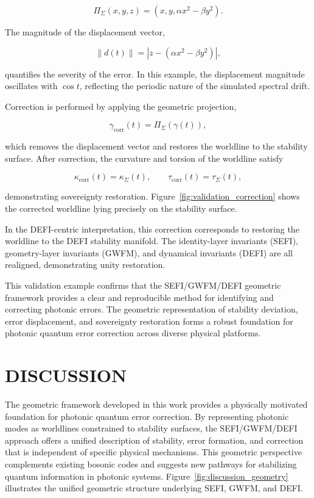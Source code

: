 \documentclass[aip,adv,reprint,floatfix]{revtex4-2}
\begin{document}
\[
\Pi_{\Sigma}(x, y, z) = (x, y, \alpha x^{2} - \beta y^{2}).
\]


The magnitude of the displacement vector,


\[
\|d(t)\| = |z - (\alpha x^{2} - \beta y^{2})|,
\]


quantifies the severity of the error.\cite{DuttonElectronField2026}
In this example, the
displacement magnitude oscillates with $\cos t$, reflecting
the periodic nature of the simulated spectral drift.

Correction is performed by applying the geometric projection,


\[
\gamma_{\mathrm{corr}}(t) = \Pi_{\Sigma}(\gamma(t)),
\]


which removes the displacement vector and restores the
worldline to the stability surface.\cite{DuttonSEFI2026}
After correction, the
curvature and torsion of the worldline satisfy


\[
\kappa_{\mathrm{corr}}(t) = \kappa_{\Sigma}(t), \qquad \tau_{\mathrm{corr}}(t) = \tau_{\Sigma}(t),
\]


demonstrating sovereignty restoration. Figure~\ref{fig:validation_correction}
shows the corrected worldline lying precisely on the stability surface.

In the DEFI-centric interpretation, this correction corresponds to restoring the worldline to the DEFI stability manifold.\cite{DuttonSEFI2026}
The identity-layer invariants (SEFI),
geometry-layer invariants (GWFM), and dynamical invariants (DEFI) are all realigned, demonstrating unity
restoration.

This validation example confirms that the
SEFI/GWFM/DEFI geometric framework provides
a clear and reproducible method for identifying and
correcting photonic errors.\cite{DuttonElectronField2026}
The geometric representation of stability deviation, error displacement, and
sovereignty restoration forms a robust foundation
for photonic quantum error correction across diverse
physical platforms.
\section{DISCUSSION}

The geometric framework developed in this work provides a physically motivated foundation for photonic
quantum error correction.\cite{DuttonSEFI2026,DuttonElectronField2026}
By representing photonic
modes as worldlines constrained to stability surfaces, the
SEFI/GWFM/DEFI approach offers a unified description of stability, error formation, and correction that is
independent of specific physical mechanisms. This geometric perspective complements existing bosonic codes
and suggests new pathways for stabilizing quantum information in photonic systems. Figure~\ref{fig:discussion_geometry}
illustrates the unified geometric structure underlying SEFI, GWFM, and DEFI.
\end{document}

